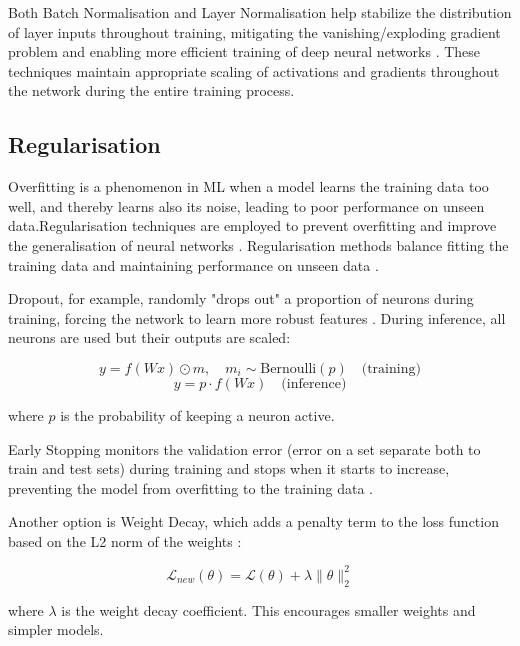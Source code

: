 \documentclass[a4paper, oneside]{discothesis}
\begin{document}
Both Batch Normalisation and Layer Normalisation help stabilize the distribution of layer inputs throughout training, mitigating the vanishing/exploding gradient problem and enabling more efficient training of deep neural networks \cite{santurkar2019does}. These techniques maintain appropriate scaling of activations and gradients throughout the network during the entire training process.

\subsection{Regularisation}

Overfitting is a phenomenon in ML when a model learns the training data too well, and thereby learns also its noise, leading to poor performance on unseen data.Regularisation techniques are employed to prevent overfitting and improve the generalisation of neural networks \cite{goodfellow2016deep}. Regularisation methods balance fitting the training data and maintaining performance on unseen data \cite{bishop2006pattern}.

Dropout, for example, randomly "drops out" a proportion of neurons during training, forcing the network to learn more robust features \cite{dropout}. During inference, all neurons are used but their outputs are scaled:

\begin{equation}
    y = f(Wx) \odot m, \quad m_i \sim \text{Bernoulli}(p) \quad \text{(training)}
\end{equation}
\begin{equation}
    y = p \cdot f(Wx) \quad \text{(inference)}
\end{equation}

where $p$ is the probability of keeping a neuron active.

Early Stopping monitors the validation error (error on a set separate both to train and test sets) during training and stops when it starts to increase, preventing the model from overfitting to the training data \cite{prechelt1998early}. 

Another option is Weight Decay, which adds a penalty term to the loss function based on the L2 norm of the weights \cite{krogh1992simple}:

\begin{equation}
    \mathcal{L}_{new}(\theta) = \mathcal{L}(\theta) + \lambda \|\theta\|_2^2
\end{equation}

where $\lambda$ is the weight decay coefficient. This encourages smaller weights and simpler models.
\end{document}
